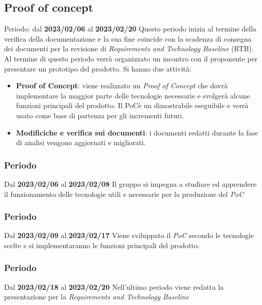 \subsection{Proof of concept}
Periodo: dal \textbf{2023/02/06} al \textbf{2023/02/20} \newline
Questo periodo inizia al termine della verifica della documentazione e la sua fine coincide con la scadenza
di consegna dei documenti per la revisione di \textit{Requirements and Technology Baseline\glo} (RTB\glo).
Al termine di questo periodo verrà organizzato un incontro con il proponente per presentare un prototipo del prodotto.\newline
Si hanno due attività:
\begin{itemize}
        \item \textbf{Proof of Concept}: viene realizzato un \textit{Proof of Concept} che dovrà implementare la maggior 
        parte delle tecnologie necessarie e svolgerà alcune funzioni principali del prodotto. Il PoC\glo è un dimostrabile eseguibile
        e verrà usato come base di partenza per gli incrementi futuri.
        \item \textbf{Modificiche e verifica sui documenti}: i documenti redatti durante la fase di analisi vengono aggiornati e migliorati.
\end{itemize}
\subsubsection{ Periodo}
Dal \textbf{2023/02/06} al \textbf{2023/02/08}
\newline
Il gruppo si impegna a studiare ed apprendere il funzionamento delle tecnologie utili e necessarie per la produzione del \textit{PoC}

\subsubsection{ Periodo}
Dal \textbf{2023/02/09} al \textbf{2023/02/17}
\newline
Viene sviluppato il \textit{PoC} secondo le tecnologie scelte e si implementaranno le funzioni principali del prodotto.

\subsubsection{ Periodo}
Dal \textbf{2023/02/18} al \textbf{2023/02/20}
\newline
Nell'ultimo periodo viene redatta la presentazione per la \textit{Requirements and Technology Baseline}

